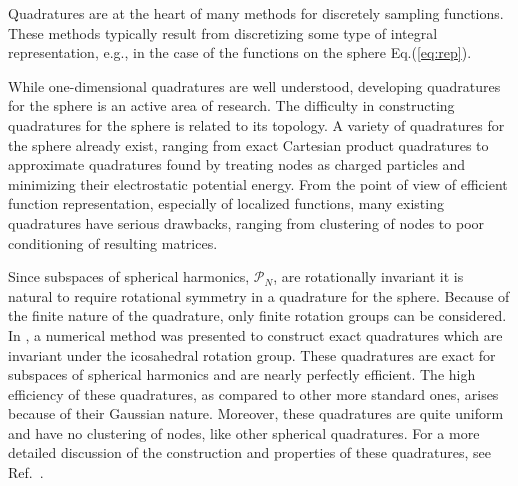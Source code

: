 \documentclass[landscape,a0b,final]{a0poster}
\newcommand{\HH}{{\mathcal P}}
\newenvironment{poster}{
  \begin{center}
  \begin{minipage}[c]{0.98\textwidth}
}{
  \end{minipage} 
  \end{center}
}
\begin{document}
\begin{poster}
\begin{multicols}{3}
Quadratures are at the heart of many methods for discretely sampling functions. These methods typically result from 
discretizing some type of integral representation, e.g., in the case of the functions on the sphere Eq.(\ref{eq:rep}). 

\hspace{1cm}While one-dimensional quadratures are well understood, developing quadratures for the sphere is an active area of research. The difficulty in constructing quadratures for the sphere is related to its topology. A variety of quadratures for the sphere already exist, ranging from exact Cartesian product quadratures to approximate quadratures found by treating nodes as charged particles and minimizing their electrostatic potential energy. From the point of view of efficient function representation, especially of localized functions, many existing quadratures have serious drawbacks, ranging from clustering of nodes to poor conditioning of resulting matrices.

\hspace{1cm}Since subspaces of spherical harmonics, $\HH_{N}$, are rotationally invariant it is natural to require rotational symmetry in a quadrature for the sphere. Because of the finite nature of the quadrature, only finite rotation groups can be considered. In \cite{AHR-BEY-2009}, a numerical method was presented to construct exact quadratures which are invariant under the icosahedral rotation group. These quadratures are exact for subspaces of spherical harmonics and are nearly perfectly efficient. The high efficiency of these quadratures, as compared to other more standard ones, arises because of their Gaussian nature. Moreover, these quadratures are quite uniform and have no clustering of nodes, like other spherical quadratures. For a more detailed discussion of the construction and properties of these quadratures, see Ref.~\cite{AHR-BEY-2009}. 


\end{multicols}
\end{poster}
\end{document}
